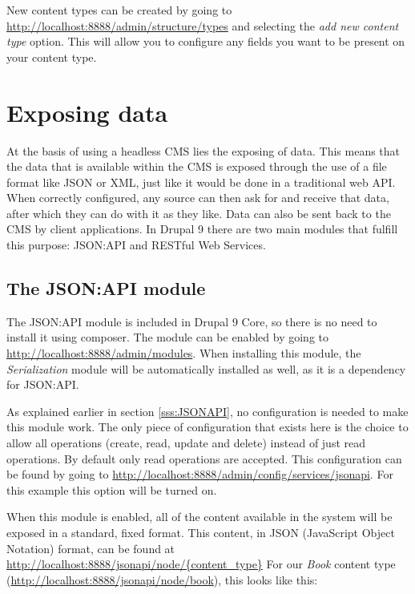 New content types can be created by going to \url{http://localhost:8888/admin/structure/types} and selecting the \emph{add new content type} option. This will allow you to configure any fields you want to be present on your content type.


\section{Exposing data}

At the basis of using a headless CMS lies the exposing of data. This means that the data that is available within the CMS is exposed through the use of a file format like JSON or XML, just like it would be done in a traditional web API. When correctly configured, any source can then ask for and receive that data, after which they can do with it as they like. Data can also be sent back to the CMS by client applications. In Drupal 9 there are two main modules that fulfill this purpose: JSON:API and RESTful Web Services.

\subsection{The JSON:API module}

The JSON:API module is included in Drupal 9 Core, so there is no need to install it using composer. The module can be enabled by going to \url{http://localhost:8888/admin/modules}. When installing this module, the \emph{Serialization} module will be automatically installed as well, as it is a dependency for JSON:API.

As explained earlier in section \ref{sss:JSONAPI}, no configuration is needed to make this module work. The only piece of configuration that exists here is the choice to allow all operations (create, read, update and delete) instead of just read operations. By default only read operations are accepted. This configuration can be found by going to \url{http://localhost:8888/admin/config/services/jsonapi}. For this example this option will be turned on.

When this module is enabled, all of the content available in the system will be exposed in a standard, fixed format. This content, in JSON (JavaScript Object Notation) format, can be found at \url{http://localhost:8888/jsonapi/node/{content_type}} For our \emph{Book} content type (\url{http://localhost:8888/jsonapi/node/book}), this looks like this:

